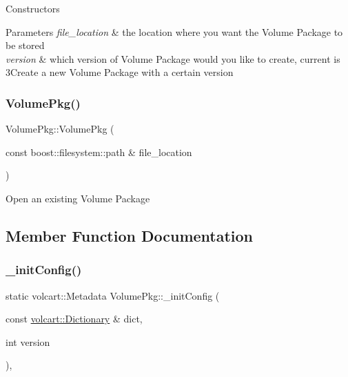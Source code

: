 Constructors 
\begin{DoxyParams}{Parameters}
{\em file\+\_\+location} & the location where you want the Volume Package to be stored \\
\hline
{\em version} & which version of Volume Package would you like to create, current is 3\+Create a new Volume Package with a certain version \\
\hline
\end{DoxyParams}
\hypertarget{classVolumePkg_a901f84ed2afd19ca64d4052e55340bb5}{}\label{classVolumePkg_a901f84ed2afd19ca64d4052e55340bb5} 
\subsubsection{\texorpdfstring{Volume\+Pkg()}{VolumePkg()}\hspace{0.1cm}{\footnotesize\ttfamily [2/2]}}
{\footnotesize\ttfamily Volume\+Pkg\+::\+Volume\+Pkg (\begin{DoxyParamCaption}\item[{const boost\+::filesystem\+::path \&}]{file\+\_\+location }\end{DoxyParamCaption})}

Open an existing Volume Package 

\subsection{Member Function Documentation}
\hypertarget{classVolumePkg_ab1829cf70b3b0a6031a85019ad8ecae7}{}\label{classVolumePkg_ab1829cf70b3b0a6031a85019ad8ecae7} 
\subsubsection{\texorpdfstring{\+\_\+init\+Config()}{\_initConfig()}}
{\footnotesize\ttfamily static volcart\+::\+Metadata Volume\+Pkg\+::\+\_\+init\+Config (\begin{DoxyParamCaption}\item[{const \hyperlink{namespacevolcart_aa4e334ff80b678b9556aee59618eb37a}{volcart\+::\+Dictionary} \&}]{dict,  }\item[{int}]{version }\end{DoxyParamCaption})\hspace{0.3cm}{\ttfamily [static]}, {\ttfamily [private]}}

